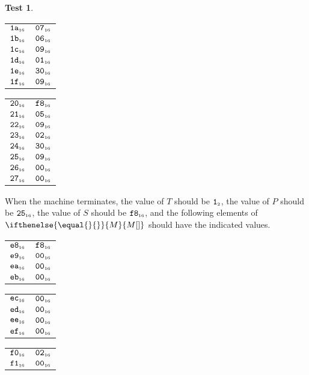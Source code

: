 \documentclass[a4paper,12pt]{article}
\makeatletter
\newcommand{\num}[1]{\texttt{\MakeLowercase{#1}}}
\newcommand{\hex}[1]{\num{#1}_{\textup{\tiny 16}}}
\newcommand{\bin}[1]{\num{#1}_{\textup{\tiny 2}}}
\newcommand{\MEM}[1]{\ifthenelse{\equal{#1}{}}{M}{M[#1]}}
\newcommand{\PC}{P}
\newcommand{\SP}{S}
\newcommand{\TERM}{T}
\newcommand{\T}{\bin{1}}
\theoremstyle{definition}
\newtheorem{test}{Test}
\newenvironment{memtable}{%
  \begin{trivlist}
    \item
    }{%
    \end{trivlist}}
\newenvironment{memcolumn}{%
  \begin{tabular}{@{}ll@{}}
    \hline}
    {%
    \hline
  \end{tabular}}
\newcommand{\memspace}{\qquad}
\makeatother
\begin{document}
\begin{test}
\begin{memtable}
\begin{memcolumn}
      $\hex{1A}$ & $\hex{07}$ \\
      $\hex{1B}$ & $\hex{06}$ \\
      $\hex{1C}$ & $\hex{09}$ \\
      $\hex{1D}$ & $\hex{01}$ \\
      $\hex{1E}$ & $\hex{30}$ \\
      $\hex{1F}$ & $\hex{09}$ \\
    \end{memcolumn}
    \memspace
    \begin{memcolumn}
      $\hex{20}$ & $\hex{F8}$ \\
      $\hex{21}$ & $\hex{05}$ \\
      $\hex{22}$ & $\hex{09}$ \\
      $\hex{23}$ & $\hex{02}$ \\
      $\hex{24}$ & $\hex{30}$ \\
      $\hex{25}$ & $\hex{09}$ \\
      $\hex{26}$ & $\hex{00}$ \\
      $\hex{27}$ & $\hex{00}$ \\
    \end{memcolumn}
  \end{memtable}
  When the machine terminates, the value of $\TERM$ should be $\T$, the value of $\PC$ should be $\hex{25}$, the value of $\SP$ should be $\hex{F8}$, and the following elements of $\MEM{}$ should have the indicated values.
  \begin{memtable}
    \begin{memcolumn}
      $\hex{E8}$ & $\hex{F8}$ \\
      $\hex{E9}$ & $\hex{00}$ \\
      $\hex{EA}$ & $\hex{00}$ \\
      $\hex{EB}$ & $\hex{00}$ \\
    \end{memcolumn}
    \memspace
    \begin{memcolumn}
      $\hex{EC}$ & $\hex{00}$ \\
      $\hex{ED}$ & $\hex{00}$ \\
      $\hex{EE}$ & $\hex{00}$ \\
      $\hex{EF}$ & $\hex{00}$ \\
    \end{memcolumn}
    \memspace
    \begin{memcolumn}
      $\hex{F0}$ & $\hex{02}$ \\
      $\hex{F1}$ & $\hex{00}$ \\

\end{memcolumn}
\end{memtable}
\end{test}
\end{document}
